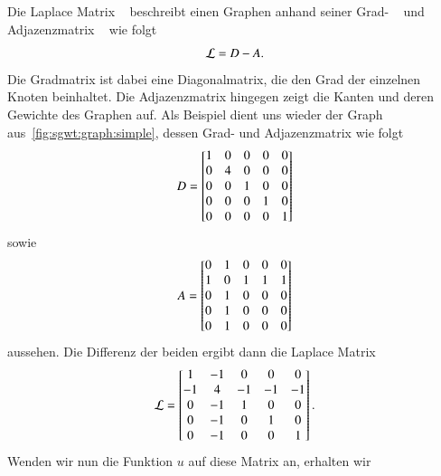 Die Laplace Matrix \laplaceL{}~\cite{noauthor_laplace-matrix_2017} beschreibt 
einen Graphen anhand seiner Grad- \degreeM{}~\cite{noauthor_degree_2018} 
und Adjazenzmatrix \adjacencyM{}~\cite{noauthor_adjacency_2019} wie folgt
\begin{equation}
\laplaceL = \degreeM - \adjacencyM.
\label{eq:sgwt:laplace}
\end{equation}
Die Gradmatrix \degreeM{} ist dabei eine Diagonalmatrix, die den Grad der 
einzelnen Knoten beinhaltet. Die Adjazenzmatrix hingegen zeigt die Kanten und 
deren Gewichte des Graphen auf. Als Beispiel dient uns 
wieder der Graph aus~\cref{fig:sgwt:graph:simple}, dessen Grad- und 
Adjazenzmatrix wie folgt
\begin{equation*}
\degreeM =
\begin{bmatrix}
1 & 0 & 0 & 0 & 0 \\
0 & 4 & 0 & 0 & 0 \\
0 & 0 & 1 & 0 & 0 \\
0 & 0 & 0 & 1 & 0 \\
0 & 0 & 0 & 0 & 1
\end{bmatrix}
\end{equation*}
sowie
\begin{equation*}
\adjacencyM =
\begin{bmatrix}
0 & 1 & 0 & 0 & 0 \\
1 & 0 & 1 & 1 & 1 \\
0 & 1 & 0 & 0 & 0 \\
0 & 1 & 0 & 0 & 0 \\
0 & 1 & 0 & 0 & 0
\end{bmatrix}
\end{equation*}
aussehen. Die Differenz der beiden ergibt dann die Laplace Matrix
\begin{equation*}
\laplaceL =
\begin{bmatrix}
1 & -1 & 0 & 0 & 0 \\
-1 & 4 & -1 & -1 & -1 \\
0 & -1 & 1 & 0 & 0 \\
0 & -1 & 0 & 1 & 0 \\
0 & -1 & 0 & 0 & 1
\end{bmatrix}.
\end{equation*}
Wenden wir nun die Funktion $u$ auf diese Matrix an, erhalten wir
